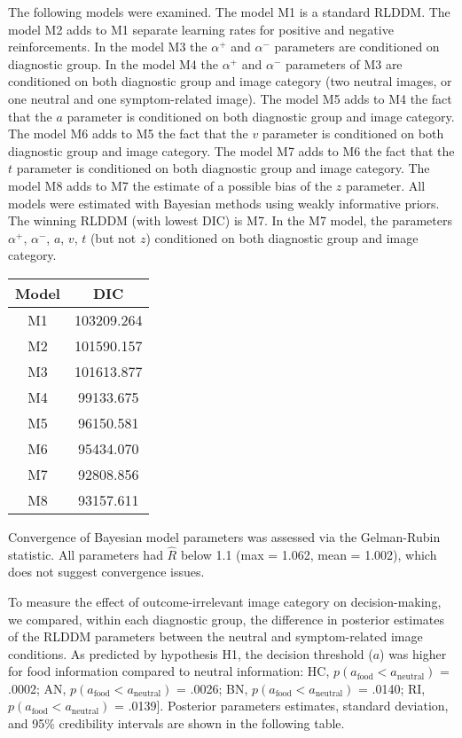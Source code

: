 \documentclass[
  man,floatsintext]{apa6}
\begin{document}
The following models were examined. The model M1 is a standard RLDDM. The model M2 adds to M1 separate learning rates for positive and negative reinforcements. In the model M3 the \(\alpha^+\) and \(\alpha^-\) parameters are conditioned on diagnostic group. In the model M4 the \(\alpha^+\) and \(\alpha^-\) parameters of M3 are conditioned on both diagnostic group and image category (two neutral images, or one neutral and one symptom-related image). The model M5 adds to M4 the fact that the \(a\) parameter is conditioned on both diagnostic group and image category. The model M6 adds to M5 the fact that the \(v\) parameter is conditioned on both diagnostic group and image category. The model M7 adds to M6 the fact that the \(t\) parameter is conditioned on both diagnostic group and image category. The model M8 adds to M7 the estimate of a possible bias of the \(z\) parameter. All models were estimated with Bayesian methods using weakly informative priors. The winning RLDDM (with lowest DIC) is M7. In the M7 model, the parameters \(\alpha^+\), \(\alpha^-\), \(a\), \(v\), \(t\) (but not \(z\)) conditioned on both diagnostic group and image category.

\begin{longtable}[]{@{}cc@{}}
\toprule()
Model & DIC \\
\midrule()
\endhead
M1 & 103209.264 \\
M2 & 101590.157 \\
M3 & 101613.877 \\
M4 & 99133.675 \\
M5 & 96150.581 \\
M6 & 95434.070 \\
M7 & 92808.856 \\
M8 & 93157.611 \\
\bottomrule()
\end{longtable}

Convergence of Bayesian model parameters was assessed via the Gelman-Rubin statistic. All parameters had \(\hat{R}\) below 1.1 (max = 1.062, mean = 1.002), which does not suggest convergence issues.

To measure the effect of outcome-irrelevant image category on decision-making, we compared, within each diagnostic group, the difference in posterior estimates of the RLDDM parameters between the neutral and symptom-related image conditions. As predicted by hypothesis H1, the decision threshold (\(a\)) was higher for food information compared to neutral information: HC, \(p(a_\text{food} < a_\text{neutral})\) = .0002; AN, \(p(a_\text{food} < a_\text{neutral})\) = .0026; BN, \(p(a_\text{food} < a_\text{neutral})\) = .0140; RI, \(p(a_\text{food} < a_\text{neutral})\) = .0139{]}. Posterior parameters estimates, standard deviation, and 95\% credibility intervals are shown in the following table.
\end{document}
